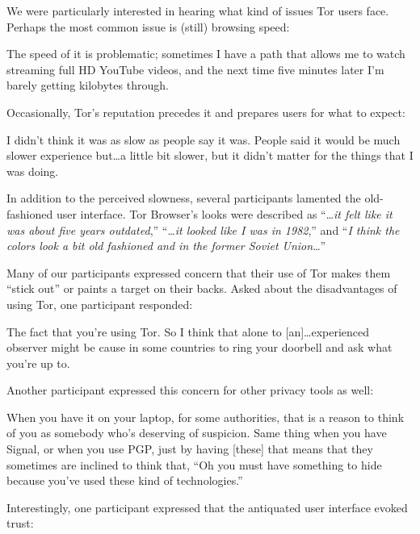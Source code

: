 We were particularly interested in hearing what kind of issues Tor users face.
Perhaps the most common issue is (still) browsing speed:

\begin{displayquote}
The speed of it is problematic; sometimes I have a path that allows me to watch
streaming full HD YouTube videos, and the next time five minutes later I'm
barely getting kilobytes through.
\end{displayquote}

Occasionally, Tor's reputation precedes it and prepares users for what to
expect:

\begin{displayquote}
I didn't think it was as slow as people say it was. People said it would be much
slower experience but\ldots a little bit slower, but it didn't matter for the
things that I was doing.
\end{displayquote}

In addition to the perceived slowness, several participants lamented the
old-fashioned user interface.  Tor Browser's looks were described as
``\dots\emph{it felt like it was about five years outdated},'' ``\dots\emph{it
looked like I was in 1982},'' and ``\emph{I think the colors look a bit old
fashioned and in the former Soviet Union}\dots''

Many of our participants expressed concern that their use of Tor makes them
``stick out'' or paints a target on their backs.  Asked about the disadvantages
of using Tor, one participant responded:

\begin{displayquote}
The fact that you're using Tor.  So I think that alone to [an]\dots experienced
observer might be cause in some countries to ring your doorbell and ask what
you're up to.
\end{displayquote}

Another participant expressed this concern for other privacy tools as well:

\begin{displayquote}
When you have it on your laptop, for some authorities, that is a reason to think
of you as somebody who's deserving of suspicion.  Same thing when you have
Signal, or when you use PGP, just by having [these] that means that they
sometimes are inclined to think that, ``Oh you must have something to hide
because you've used these kind of technologies.''
\end{displayquote}

Interestingly, one participant expressed that the antiquated user interface
evoked trust:

